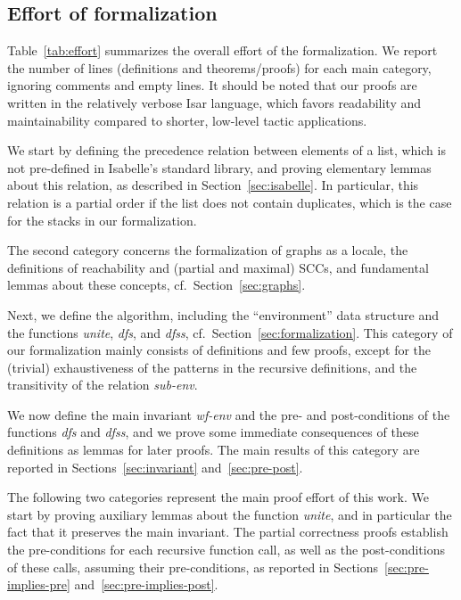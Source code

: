 \documentclass[sigplan,10pt,anonymous,review]{acmart}
\newcommand{\prog}[1]{\textit{#1}}
\begin{document}
\subsection{Effort of formalization}
\label{sec:effort}

Table~\ref{tab:effort} summarizes the overall effort of the formalization. We report the number of lines (definitions and theorems/proofs) for each main category, ignoring comments and empty lines. It should be noted that our proofs are written in the relatively verbose Isar language, which favors readability and maintainability compared to shorter, low-level tactic applications.

We start by defining the precedence relation between elements of a list, which is not pre-defined in Isabelle's standard library, and proving elementary lemmas about this relation, as described in Section~\ref{sec:isabelle}. In particular, this relation is a partial order if the list does not contain duplicates, which is the case for the stacks in our formalization.

The second category concerns the formalization of graphs as a locale, the definitions of reachability and (partial and maximal) SCCs, and fundamental lemmas about these concepts, cf.\ Section~\ref{sec:graphs}.

Next, we define the algorithm, including the ``environment'' data structure and the functions \prog{unite}, \prog{dfs}, and \prog{dfss}, cf.\ Section~\ref{sec:formalization}. This category of our formalization mainly consists of definitions and few proofs, except for the (trivial) exhaustiveness of the patterns in the recursive definitions, and the transitivity of the relation \prog{sub-env}.

We now define the main invariant \prog{wf-env} and the pre- and post-conditions of the functions \prog{dfs} and \prog{dfss}, and we prove some immediate consequences of these definitions as lemmas for later proofs. The main results of this category are reported in Sections~\ref{sec:invariant} and~\ref{sec:pre-post}.

The following two categories represent the main proof effort of this work. We start by proving auxiliary lemmas about the function \prog{unite}, and in particular the fact that it preserves the main invariant. The partial correctness proofs establish the pre-conditions for each recursive function call, as well as the post-conditions of these calls, assuming their pre-conditions, as reported in Sections~\ref{sec:pre-implies-pre} and~\ref{sec:pre-implies-post}.
\end{document}
